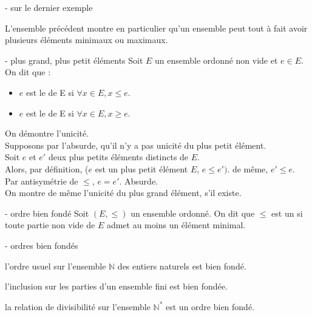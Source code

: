 \begin{remarque}{6.21}{- sur le dernier exemple}
    \item L'ensemble précédent montre en particulier qu'un ensemble peut tout à fait avoir plusieurs éléments minimaux ou maximaux.
\end{remarque}

\begin{definition}{6.22}{- plus grand, plus petit éléments}
    Soit $E$ un ensemble ordonné non vide et $e\in E$. On dit que :
    \begin{itemize}
        \item $e$ est le  de E si $\forall x \in E, x \leq e$.
        \item $e$ est le  de E si $\forall x \in E, x \geq e$.
    \end{itemize}
\end{definition}


\begin{demonstration}
    On démontre l'unicité.\\
    Supposons par l'absurde, qu'il n'y a pas unicité du plus petit élément. \\
    Soit $e$ et $e'$ deux plus petits éléments distincts de $E$. \\
    Alors, par définition, ($e$ est un plus petit élément $E$, $e \leq e')$. de même, $e' \leq e$. \\
    Par antisymétrie de $\leq$, $e=e'$. Absurde.\\
    On montre de même l'unicité du plus grand élément, s'il existe.
\end{demonstration}


\begin{definition}{6.23}{- ordre bien fondé}
    Soit $(E,\leq)$ un ensemble ordonné.
    On dit que $\leq$ est un  si toute partie non vide de $E$ admet au moins un élément minimal.
\end{definition}

\begin{exemple}{6.24}{- ordres bien fondés}
    \item l'ordre usuel sur l'ensemble $\mathbb{N}$ des entiers naturels est bien fondé.
    \item l'inclusion sur les parties d'un ensemble fini est bien fondée.
    \item la relation de divisibilité sur l'ensemble $\mathbb{N}^*$ est un ordre bien fondé.
\end{exemple}


